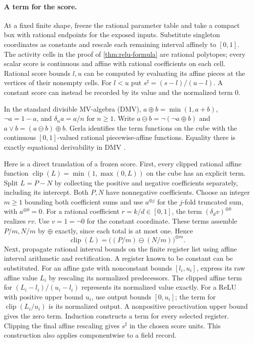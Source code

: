 \documentclass[11pt,a4paper]{article}
\theoremstyle{definition}
\theoremstyle{remark}\newaliascnt{remark}{theorem}
\numberwithin{equation}{section}
\begin{document}
\paragraph{A term for the score.}
At a fixed finite shape, freeze the rational parameter table and take a compact box with rational endpoints for the exposed inputs. Substitute singleton coordinates as constants and rescale each remaining interval affinely to \([0,1]\). The activity cells in the proof of \cref{thm:relu-formula} are rational polytopes; every scalar score is continuous and affine with rational coefficients on each cell. Rational score bounds \(l,u\) can be computed by evaluating its affine pieces at the vertices of their nonempty cells. For \(l<u\) put \(s^\sharp=(s-l)/(u-l)\). A constant score can instead be recorded by its value and the normalized term \(0\).

In the standard divisible MV-algebra (DMV), \(a\oplus b=\min(1,a+b)\), \(\neg a=1-a\), and \(\delta_n a=a/n\) for \(n\ge1\). Write \(a\ominus b=\neg(\neg a\oplus b)\) and \(a\vee b=(a\ominus b)\oplus b\). Gerla identifies the term functions on the cube with the continuous \([0,1]\)-valued rational piecewise-affine functions. Equality there is exactly equational derivability in DMV \cite[Theorems 3.15 and 4.5]{gerla-dmv}.

Here is a direct translation of a frozen score. First, every clipped rational affine function \(\operatorname{clip}(L)=\min(1,\max(0,L))\) on the cube has an explicit term. Split \(L=P-N\) by collecting the positive and negative coefficients separately, including its intercept. Both \(P,N\) have nonnegative coefficients. Choose an integer \(m\ge1\) bounding both coefficient sums and use \(a^{\oplus j}\) for the \(j\)-fold truncated sum, with \(a^{\oplus0}=0\). For a rational coefficient \(r=k/d\in[0,1]\), the term \((\delta_d v)^{\oplus k}\) realizes \(rv\). Use \(v=1=\neg0\) for the constant coordinate. These terms assemble \(P/m,N/m\) by \(\oplus\) exactly, since each total is at most one. Hence
\[
 \operatorname{clip}(L)=\bigl((P/m)\ominus(N/m)\bigr)^{\oplus m}.
\]
Next, propagate rational interval bounds on the finite register list using affine interval arithmetic and rectification. A register known to be constant can be substituted. For an affine gate with nonconstant bounds \([l_i,u_i]\), express its raw affine value \(L_i\) by rescaling its normalized predecessors. The clipped affine term for \((L_i-l_i)/(u_i-l_i)\) represents its normalized value exactly. For a ReLU with positive upper bound \(u_i\), use output bounds \([0,u_i]\); the term for \(\operatorname{clip}(L_i/u_i)\) is its normalized output. A nonpositive preactivation upper bound gives the zero term. Induction constructs a term for every selected register. Clipping the final affine rescaling gives \(s^\sharp\) in the chosen score units. This construction also applies componentwise to a field record.
\end{document}
